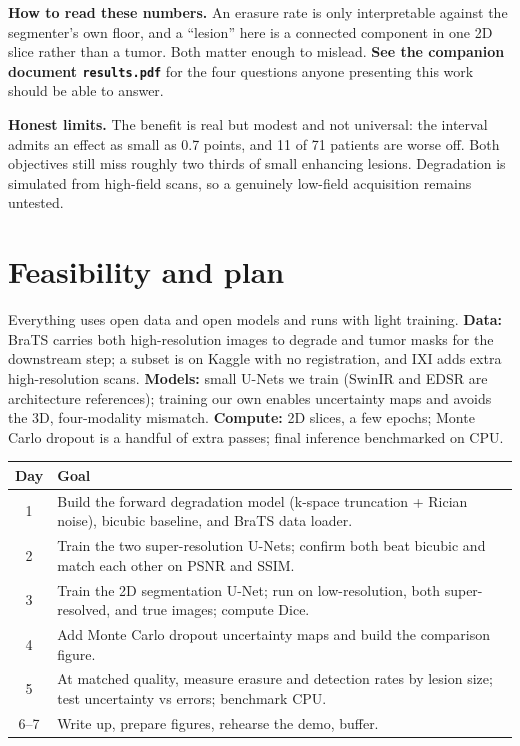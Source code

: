 \documentclass[11pt,a4paper]{article}
\begin{document}
\textbf{How to read these numbers.} An erasure rate is only interpretable against the segmenter's own floor, and a ``lesion'' here is a connected component in one 2D slice rather than a tumor. Both matter enough to mislead. \textbf{See the companion document \texttt{results.pdf}} for the four questions anyone presenting this work should be able to answer.

\textbf{Honest limits.} The benefit is real but modest and not universal: the interval admits an effect as small as 0.7 points, and 11 of 71 patients are worse off. Both objectives still miss roughly two thirds of small enhancing lesions. Degradation is simulated from high-field scans, so a genuinely low-field acquisition remains untested.

\section*{Feasibility and plan}

Everything uses open data and open models and runs with light training. \textbf{Data:} BraTS carries both high-resolution images to degrade and tumor masks for the downstream step; a subset is on Kaggle with no registration, and IXI adds extra high-resolution scans. \textbf{Models:} small U-Nets we train (SwinIR and EDSR are architecture references); training our own enables uncertainty maps and avoids the 3D, four-modality mismatch. \textbf{Compute:} 2D slices, a few epochs; Monte Carlo dropout is a handful of extra passes; final inference benchmarked on CPU.

\begin{center}
\renewcommand{\arraystretch}{1.15}
\begin{tabular}{@{}c>{\raggedright\arraybackslash}p{13.2cm}@{}}
\toprule
\textbf{Day} & \textbf{Goal} \\
\midrule
1 & Build the forward degradation model (k-space truncation + Rician noise), bicubic baseline, and BraTS data loader. \\
2 & Train the two super-resolution U-Nets; confirm both beat bicubic and match each other on PSNR and SSIM. \\
3 & Train the 2D segmentation U-Net; run on low-resolution, both super-resolved, and true images; compute Dice. \\
4 & Add Monte Carlo dropout uncertainty maps and build the comparison figure. \\
5 & At matched quality, measure erasure and detection rates by lesion size; test uncertainty vs errors; benchmark CPU. \\
6--7 & Write up, prepare figures, rehearse the demo, buffer. \\
\bottomrule
\end{tabular}
\end{center}
\end{document}
